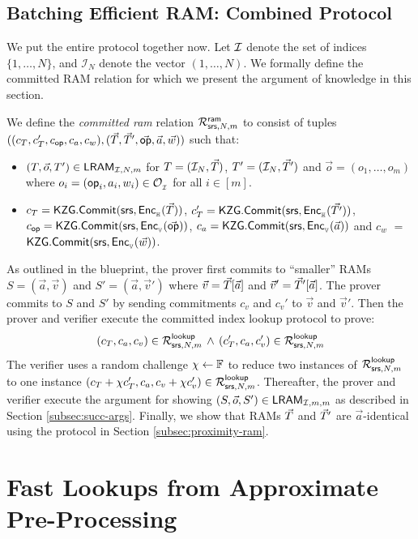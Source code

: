 \subsection{Batching Efficient RAM: Combined Protocol}\label{subsec:all-together}
We put the entire protocol together now. Let $\mathcal{I}$ denote the set of indices $\{1,\ldots,N\}$, and $\mathcal{I}_N$
denote the vector $(1,\ldots,N)$. We formally define the committed RAM relation for which we present the argument of
knowledge in this section.
\begin{definition}\label{defn:committed-ram}
We define the {\em committed ram} relation
$\mathcal{R}^{\mathsf{ram}}_{\mathsf{srs},N,m}$ to consist of tuples $((c_T, c_T', c_{\mathsf{op}}, c_a, c_w),(\vec{T}, \vec{T}',\vec{\mathsf{op}},\vec{a},\vec{w}))$
such that:
\begin{itemize}[leftmargin=1em]
\item $(T,\vec{o},T')\in \mathsf{LRAM}_{\mathcal{I},N,m}$ for $T=(\mathcal{I}_N,\vec{T})$, $T'=(\mathcal{I}_N,\vec{T}')$ and $\vec{o}=(o_1,\ldots,o_m)$
where $o_i=(\mathsf{op}_i, a_i, w_i)\in \mathcal{O}_{{}_\mathcal{I}}$ for all $i\in [m]$.
\item $c_T=\mathsf{KZG.Commit}(\mathsf{srs},\mathsf{Enc}_{{}_{\mathbb{H}}}(\vec{T}))$, $c_T'=\mathsf{KZG.Commit}(\mathsf{srs},\mathsf{Enc}_{{}_{\mathbb{H}}}(\vec{T'}))$, $c_{\mathsf{op}}=\mathsf{KZG.Commit}(\mathsf{srs},\mathsf{Enc}_{{}_{\mathbb{V}}}(\vec{\mathsf{op}}))$,
$c_a=\mathsf{KZG.Commit}(\mathsf{srs},\mathsf{Enc}_{{}_{\mathbb{V}}}(\vec{a}))$ and $c_w$ $=$ \\ $\mathsf{KZG.Commit}(\mathsf{srs},\mathsf{Enc}_{{}_{\mathbb{V}}}(\vec{w}))$.
\end{itemize}
\end{definition}
As outlined in the blueprint, the prover first commits to ``smaller'' RAMs $S=(\vec{a},\vec{v})$ and $S'=(\vec{a},\vec{v}')$
where $\vec{v}=\vec{T}[\vec{a}]$ and $\vec{v}'=\vec{T}'[\vec{a}]$. The prover commits to $S$ and $S'$ by sending commitments
$c_v$ and $c_v'$ to $\vec{v}$ and $\vec{v}'$. Then the prover and verifier execute the committed index lookup protocol to
prove:
\begin{equation}
(c_T, c_a, c_v)\in \mathcal{R}^{\mathsf{lookup}}_{\mathsf{srs},N,m}\, \wedge\, (c_T', c_a, c_v')\in \mathcal{R}^{\mathsf{lookup}}_{\mathsf{srs},N,m}
\end{equation}
The verifier uses a random challenge $\chi\gets \mathbb{F}$ to reduce two instances of $\mathcal{R}^{\mathsf{lookup}}_{\mathsf{srs},N,m}$ to one instance
$(c_T + \chi c_T', c_a, c_v + \chi c_v')\in \mathcal{R}^{\mathsf{lookup}}_{\mathsf{srs},N,m}$. Thereafter, the prover and verifier execute the argument for
showing $(S,\vec{o},S')\in \mathsf{LRAM}_{\mathcal{I},m,m}$ as described in Section \ref{subsec:succ-args}. Finally, we show that
RAMs $\vec{T}$ and $\vec{T}'$ are $\vec{a}$-identical using the protocol in Section \ref{subsec:proximity-ram}.

\section{Fast Lookups from Approximate Pre-Processing}\label{sec:update-protocol}












